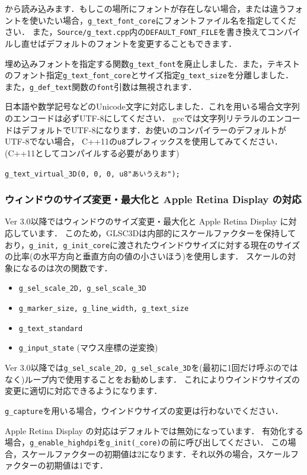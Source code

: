 \documentclass[platex,a4paper,12pt]{jsarticle}%
\begin{document}
から読み込みます．もしこの場所にフォントが存在しない場合，または違うフォントを使いたい場合，\verb|g_text_font_core|にフォントファイル名を指定してください．
また，\verb|Source/g_text.cpp|内の\verb|DEFAULT_FONT_FILE|を書き換えてコンパイルし直せばデフォルトのフォントを変更することもできます．

埋め込みフォントを指定する関数\verb|g_text_font|を廃止しました．また，テキストのフォント指定\verb|g_text_font_core|とサイズ指定\verb|g_text_size|を分離しました．
また，\verb|g_def_text|関数の\verb|font|引数は無視されます．

日本語や数学記号などのUnicode文字に対応しました．これを用いる場合文字列のエンコードは必ずUTF-8にしてください．
gccでは文字列リテラルのエンコードはデフォルトでUTF-8になります．お使いのコンパイラーのデフォルトがUTF-8でない場合，
C++11の\verb|u8|プレフィックスを使用してみてください．(C++11としてコンパイルする必要があります)
\begin{center}
\verb|g_text_virtual_3D(0, 0, 0, u8"あいうえお");|
\end{center}

\subsubsection{ウィンドウのサイズ変更・最大化と Apple Retina Display の対応}
Ver 3.0以降ではウィンドウのサイズ変更・最大化と Apple Retina Display に対応しています．
このため，GLSC3Dは内部的にスケールファクターを保持しており，\verb|g_init, g_init_core|に渡されたウインドウサイズに対する現在のサイズの比率(の水平方向と垂直方向の値の小さいほう)を使用します．
スケールの対象になるのは次の関数です．
\begin{itemize}
	\item \verb|g_sel_scale_2D, g_sel_scale_3D|
	\item \verb|g_marker_size, g_line_width, g_text_size|
	\item \verb|g_text_standard|
	\item \verb|g_input_state| (マウス座標の逆変換)
\end{itemize}
Ver 3.0以降では\verb|g_sel_scale_2D, g_sel_scale_3D|を(最初に1回だけ呼ぶのではなく)ループ内で使用することをお勧めします．
これによりウインドウサイズの変更に適切に対応できるようになります．

\verb|g_capture|を用いる場合，ウインドウサイズの変更は行わないでください．

Apple Retina Display の対応はデフォルトでは無効になっています．
有効化する場合，\verb|g_enable_highdpi|を\verb|g_init(_core)|の前に呼び出してください．
この場合，スケールファクターの初期値は2になります．それ以外の場合，スケールファクターの初期値は1です．
\end{document}
